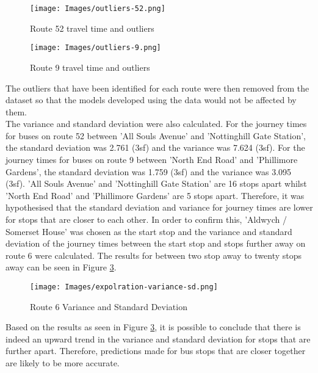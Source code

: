 \begin{figure}[H]
\begin{center}
    \texttt{[image: Images/outliers-52.png]}
    \caption{Route 52 travel time and outliers}
    \label{fig:outlier-occurences-52}
\end{center}
\end{figure}

\begin{figure}[H]
\begin{center}
    \texttt{[image: Images/outliers-9.png]}
    \caption{Route 9 travel time and outliers}
    \label{fig:outlier-occurences-9}
\end{center}
\end{figure}

The outliers that have been identified for each route were then removed from the dataset so that the models developed using the data would not be affected by them. \\

The variance and standard deviation were also calculated. For the journey times for buses on route 52 between 'All Souls Avenue' and 'Nottinghill Gate Station', the standard deviation was 2.761 (3sf) and the variance was 7.624 (3sf). For the journey times for buses on route 9 between 'North End Road' and 'Phillimore Gardens', the standard deviation was 1.759 (3sf) and the variance was 3.095 (3sf). 'All Souls Avenue' and 'Nottinghill Gate Station' are 16 stops apart whilst 'North End Road' and 'Phillimore Gardens' are 5 stops apart. Therefore, it was hypothesised that the standard deviation and variance for journey times are lower for stops that are closer to each other. In order to confirm this, 'Aldwych / Somerset House' was chosen as the start stop and the variance and standard deviation of the journey times between the start stop and stops further away on route 6 were calculated. The results for between two stop away to twenty stops away can be seen in Figure \ref{fig:variance-sd-6}.

\begin{figure}[H]
\begin{center}
    \texttt{[image: Images/expolration-variance-sd.png]}
    \caption{Route 6 Variance and Standard Deviation}
    \label{fig:variance-sd-6}
\end{center}
\end{figure}

Based on the results as seen in Figure \ref{fig:variance-sd-6}, it is possible to conclude that there is indeed an upward trend in the variance and standard deviation for stops that are further apart. Therefore, predictions made for bus stops that are closer together are likely to be more accurate. 

